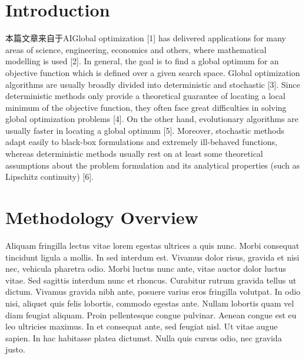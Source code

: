 \documentclass[
10pt, %
a4paper, %
twocolumn, %
landscape %
]{article}
\begin{document}
\begin{CJK*}{UTF8}{gbsn}
\pagestyle{myheadings} %
\markright{\doctitle} %


\thispagestyle{plain} %

\printtitle %


\section*{Introduction} %

本篇文章来自于AIGlobal optimization [1] has delivered applications for many areas of science, engineering, economics and
others, where mathematical modelling is used [2]. In general, the goal is to find a global optimum for an
objective function which is defined over a given search space. Global optimization algorithms are usually
broadly divided into deterministic and stochastic [3]. Since deterministic methods only provide a
theoretical guarantee of locating a local minimum of the objective function, they often face great
difficulties in solving global optimization problems [4]. On the other hand, evolutionary algorithms are
usually faster in locating a global optimum [5]. Moreover, stochastic methods adapt easily to black-box
formulations and extremely ill-behaved functions, whereas deterministic methods usually rest on at least
some theoretical assumptions about the problem formulation and its analytical properties (such as
Lipschitz continuity) [6].


\section{Methodology Overview} %

Aliquam fringilla lectus vitae lorem egestas ultrices a quis nunc. Morbi consequat tincidunt ligula a mollis. In sed interdum est. Vivamus dolor risus, gravida et nisi nec, vehicula pharetra odio. Morbi luctus nunc ante, vitae auctor dolor luctus vitae. Sed sagittis interdum nunc et rhoncus. Curabitur rutrum gravida tellus ut dictum. Vivamus gravida nibh ante, posuere varius eros fringilla volutpat. In odio nisi, aliquet quis felis lobortis, commodo egestas ante. Nullam lobortis quam vel diam feugiat aliquam. Proin pellentesque congue pulvinar. Aenean congue est eu leo ultricies maximus. In et consequat ante, sed feugiat nisl. Ut vitae augue sapien. In hac habitasse platea dictumst. Nulla quis cursus odio, nec gravida justo.


\end{CJK*}
\end{document}
